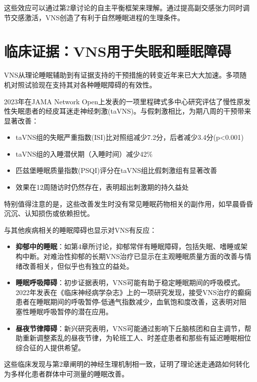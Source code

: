 \documentclass[
  Letterpaper,
]{scrbook}
\providecommand{\tightlist}{%
  \setlength{\itemsep}{0pt}\setlength{\parskip}{0pt}}\usepackage{longtable,booktabs,array}
\begin{document}
这些效应可以通过第2章讨论的自主平衡框架来理解。通过提高副交感张力同时调节交感激活，VNS创造了有利于自然睡眠进程的生理条件。

\section{临床证据：VNS用于失眠和睡眠障碍}\label{ux4e34ux5e8aux8bc1ux636evnsux7528ux4e8eux5931ux7720ux548cux7761ux7720ux969cux788d}

VNS从理论睡眠辅助到有证据支持的干预措施的转变近年来已大大加速。多项随机对照试验现在支持其对各种睡眠障碍的有效性。

2023年在JAMA Network
Open上发表的一项里程碑式多中心研究评估了慢性原发性失眠患者的经皮耳迷走神经刺激(taVNS)。与假刺激相比，为期八周的干预带来显著改善：

\begin{itemize}
\tightlist
\item
  taVNS组的失眠严重指数(ISI)比对照组减少7.2分，后者减少3.4分(p\textless0.001)
\item
  taVNS组的入睡潜伏期（入睡时间）减少42\%
\item
  匹兹堡睡眠质量指数(PSQI)评分在taVNS组比假刺激组有显著改善
\item
  效果在12周随访时仍然存在，表明超出刺激期的持久益处
\end{itemize}

特别值得注意的是，这些改善发生时没有常见睡眠药物相关的副作用，如早晨昏昏沉沉、认知损伤或依赖担忧。

与其他疾病相关的睡眠障碍也显示对VNS有反应：

\begin{itemize}
\item
  \textbf{抑郁中的睡眠}：如第4章所讨论，抑郁常伴有睡眠障碍，包括失眠、嗜睡或架构中断。对难治性抑郁的长期VNS治疗已显示在主观睡眠质量方面的改善与情绪改善相关，但似乎也有独立的益处。
\item
  \textbf{睡眠呼吸障碍}：初步证据表明，VNS可能有助于稳定睡眠期间的呼吸模式。2022年发表在《临床神经病学杂志》上的一项研究发现，接受VNS治疗的癫痫患者在睡眠期间的呼吸暂停-低通气指数减少，血氧饱和度改善，这表明对阻塞性睡眠呼吸暂停的潜在应用。
\item
  \textbf{昼夜节律障碍}：新兴研究表明，VNS可能通过影响下丘脑核团和自主调节，帮助重新调整紊乱的昼夜节律，为轮班工人、时差症患者和那些有延迟睡眠相位综合征的人提供希望。
\end{itemize}

这些临床发现与第2章阐明的神经生理机制相一致，证明了理论迷走通路如何转化为多样化患者群体中可测量的睡眠改善。
\end{document}

